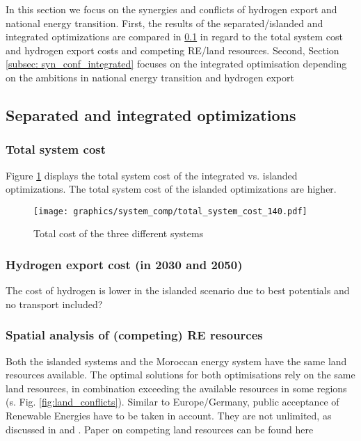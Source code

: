 In this section we focus on the synergies and conflicts
of hydrogen export and national energy transition.
First, the results of the separated/islanded and integrated optimizations
are compared in \ref{subsec: sep_int_opti} in regard to the total system cost and
hydrogen export costs and competing RE/land resources.
Second, Section \ref{subsec: syn_conf_integrated} focuses on the integrated optimisation 
depending on the ambitions in national energy transition and hydrogen export

\subsection{Separated and integrated optimizations}
\label{subsec: sep_int_opti}

\subsubsection{Total system cost}
Figure \ref{fig:int_sep_total_system_cost} displays the total system cost
of the integrated vs. islanded optimizations. The total system cost of the
islanded optimizations are higher.

\begin{figure}[h!]
    \centering
    \texttt{[image: graphics/system\_comp/total\_system\_cost\_140.pdf]}
    \caption{Total cost of the three different systems}
    \label{fig:int_sep_total_system_cost}
\end{figure}

\subsubsection{Hydrogen export cost (in 2030 and 2050)}
The cost of hydrogen is lower in the islanded scenario due to best potentials and no transport included?

\subsubsection{Spatial analysis of (competing) RE resources}
Both the islanded systems and the Moroccan energy system have the same land resources available. 
The optimal solutions for both optimisations rely on the same land resources, in combination exceeding the 
available resources in some regions (s. Fig. \ref{fig:land_conflicts}). 
Similar to Europe/Germany, public acceptance of Renewable Energies have to be taken in account. 
They are not unlimited, as discussed in \cite{Hanger2016} and \cite{TerraponPfaff2019}.
Paper on competing land resources can be found here \cite{Patankar2022}


